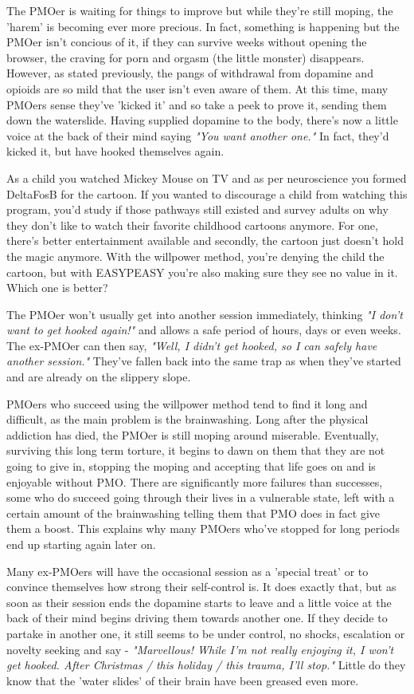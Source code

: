\documentclass[easypeasy.tex]{subfiles}
\begin{document}
The PMOer is waiting for things to improve but while they're still moping, the 'harem' is becoming ever more precious. In fact, something is happening but the PMOer isn't concious of it, if they can survive weeks without opening the browser, the craving for porn and orgasm (the little monster) disappears. However, as stated previously, the pangs of withdrawal from dopamine and opioids are so mild that the user isn't even aware of them. At this time, many PMOers sense they've 'kicked it' and so take a peek to prove it, sending them down the waterslide. Having supplied dopamine to the body, there's now a little voice at the back of their mind saying \textit{"You want another one."} In fact, they'd kicked it, but have hooked themselves again.

As a child you watched Mickey Mouse on TV and as per neuroscience you formed DeltaFosB for the cartoon. If you wanted to discourage a child from watching this program, you'd study if those pathways still existed and survey adults on why they don't like to watch their favorite childhood cartoons anymore. For one, there's better entertainment available and secondly, the cartoon just doesn't hold the magic anymore. With the willpower method, you're denying the child the cartoon, but with EASYPEASY you're also making sure they see no value in it. Which one is better?

The PMOer won't usually get into another session immediately, thinking \textit{"I don't want to get hooked again!"} and allows a safe period of hours, days or even weeks. The ex-PMOer can then say, \textit{"Well, I didn't get hooked, so I can safely have another session."} They've fallen back into the same trap as when they've started and are already on the slippery slope.

PMOers who succeed using the willpower method tend to find it long and difficult, as the main problem is the brainwashing. Long after the physical addiction has died, the PMOer is still moping around miserable. Eventually, surviving this long term torture, it begins to dawn on them that they are not going to give in, stopping the moping and accepting that life goes on and is enjoyable without PMO. There are significantly more failures than successes, some who do succeed going through their lives in a vulnerable state, left with a certain amount of the brainwashing telling them that PMO does in fact give them a boost. This explains why many PMOers who've stopped for long periods end up starting again later on.

Many ex-PMOers will have the occasional session as a 'special treat' or to convince themselves how strong their self-control is. It does exactly that, but as soon as their session ends the dopamine starts to leave and a little voice at the back of their mind begins driving them towards another one. If they decide to partake in another one, it still seems to be under control, no shocks, escalation or novelty seeking and say - \textit{"Marvellous! While I'm not really enjoying it, I won't get hooked. After Christmas / this holiday / this trauma, I'll stop."} Little do they know that the 'water slides' of their brain have been greased even more.
\end{document}
